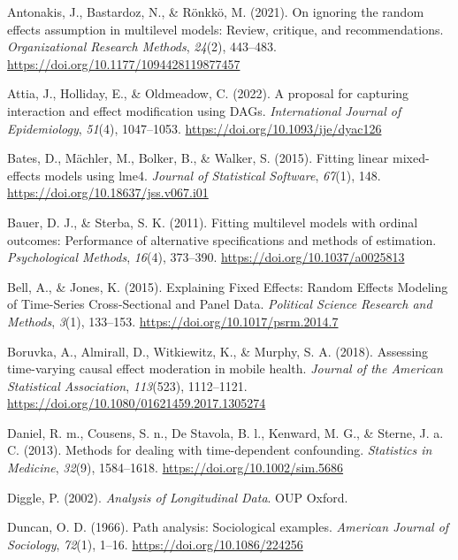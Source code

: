 \documentclass[
  11pt,
  a4paper,
]{article}
\newlength{\cslhangindent}
\newenvironment{CSLReferences}[2] %
 {\begin{list}{}{%
  \setlength{\itemindent}{0pt}
  \setlength{\leftmargin}{0pt}
  \setlength{\parsep}{0pt}
  \ifodd #1
   \setlength{\leftmargin}{\cslhangindent}
   \setlength{\itemindent}{-1\cslhangindent}
  \fi
  \setlength{\itemsep}{#2\baselineskip}}}
 {\end{list}}
\begin{document}
\label{refs}
\begin{CSLReferences}{1}{0}
Antonakis, J., Bastardoz, N., \& Rönkkö, M. (2021). On ignoring the
random effects assumption in multilevel models: Review, critique, and
recommendations. \emph{Organizational Research Methods}, \emph{24}(2),
443--483. \url{https://doi.org/10.1177/1094428119877457}

Attia, J., Holliday, E., \& Oldmeadow, C. (2022). A proposal for
capturing interaction and effect modification using DAGs.
\emph{International Journal of Epidemiology}, \emph{51}(4), 1047--1053.
\url{https://doi.org/10.1093/ije/dyac126}

Bates, D., Mächler, M., Bolker, B., \& Walker, S. (2015). Fitting linear
mixed-effects models using {lme4}. \emph{Journal of Statistical
Software}, \emph{67}(1), 148.
\url{https://doi.org/10.18637/jss.v067.i01}

Bauer, D. J., \& Sterba, S. K. (2011). Fitting multilevel models with
ordinal outcomes: Performance of alternative specifications and methods
of estimation. \emph{Psychological Methods}, \emph{16}(4), 373--390.
\url{https://doi.org/10.1037/a0025813}

Bell, A., \& Jones, K. (2015). Explaining Fixed Effects: Random Effects
Modeling of Time-Series Cross-Sectional and Panel Data. \emph{Political
Science Research and Methods}, \emph{3}(1), 133--153.
\url{https://doi.org/10.1017/psrm.2014.7}

Boruvka, A., Almirall, D., Witkiewitz, K., \& Murphy, S. A. (2018).
Assessing time-varying causal effect moderation in mobile health.
\emph{Journal of the American Statistical Association}, \emph{113}(523),
1112--1121. \url{https://doi.org/10.1080/01621459.2017.1305274}

Daniel, R. m., Cousens, S. n., De Stavola, B. l., Kenward, M. G., \&
Sterne, J. a. C. (2013). Methods for dealing with time-dependent
confounding. \emph{Statistics in Medicine}, \emph{32}(9), 1584--1618.
\url{https://doi.org/10.1002/sim.5686}

Diggle, P. (2002). \emph{Analysis of Longitudinal Data}. OUP Oxford.

Duncan, O. D. (1966). Path analysis: Sociological examples.
\emph{American Journal of Sociology}, \emph{72}(1), 1--16.
\url{https://doi.org/10.1086/224256}


\end{CSLReferences}
\end{document}

